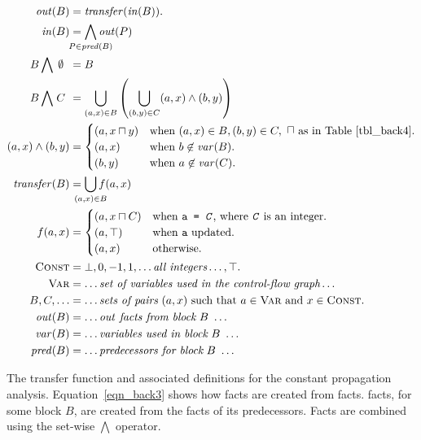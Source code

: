 \begin{myfig}
\begin{align}
  \outBa &= \mathit{transfer}(\inBa). \label{eqn_back3} \\
  \inBa &= \bigwedge\limits_{\mathclap{P \in \mathit{pred}(B)}} \outXa{P} \label{eqn_back16}\\ 
  B \bigwedge\ \,\mathclap{\emptyset}\phantom{C} &= B \notag\\
  B \bigwedge\ \,\mathclap{C}\phantom{C} &= \bigcup\limits_{(a,x) \in B}
                    \left(\bigcup\limits_{(b,y) \in C} (a,x) \wedge (b,y)\right) \label{eqn_back12}\\ 
  (a,x) \wedge (b,y) &= 
  \begin{cases}
    (a,x \lub y) & \text{when}\ (a,x) \in B, (b,y) \in C,\ \text{\lub as in Table~\ref{tbl_back4}.}\\
    (a,x) & \text{when}\ b \not\in \mathit{var}(B). \\
    (b,y) & \text{when}\ a \not\in \mathit{var}(C). \\
  \end{cases} \label{eqn_back13}\\ 
  \mathit{transfer}(B) &= \bigcup\limits_{\mathclap{(a,x) \in B}} f(a,x) \label{eqn_back15}\\
  f (a,x) &= 
  \begin{cases}
    (a,x \lub C) & \text{when \texttt{a = \emph{C}}, where \texttt{\emph{C}} is an integer}. \\
    (a,\top) & \text{when \texttt{a} updated}. \\
    (a,x) & \text{otherwise}. \label{eqn_back14}\\
  \end{cases} \\
  \setLC &= \bot, 0, -1, 1, \dots \text{\it all integers} \dots, \top. \notag\\
  \setL{Var} &= \dots \text{\it set of variables used in the control-flow graph} \dots \notag\\
  B, C, \dots &= \dots \text{\it sets of pairs}\ (a, x)\ \text{such that}\ a \in 
    \setL{Var}\ \text{and}\ x \in \setLC. \notag\\
  \mathit{out}(B) &= \dots \text{\it \out facts from block}\ B\ \dots \notag\\
  \mathit{var}(B) &= \dots \text{\it variables used in block}\ B\ \dots \notag\\
  \mathit{pred}(B) &= \dots \text{\it predecessors for block}\ B\ \dots \notag
\end{align}
\caption{The transfer function and associated definitions for the constant
  propagation analysis. Equation~\eqref{eqn_back3} shows how \out facts are
  created from \inE facts. \InBa facts, for some block $B$, are created from
  the \outBa facts of its predecessors. Facts are combined using the set-wise
  $\bigwedge$ operator.}
\label{fig_back10}
\end{myfig}
